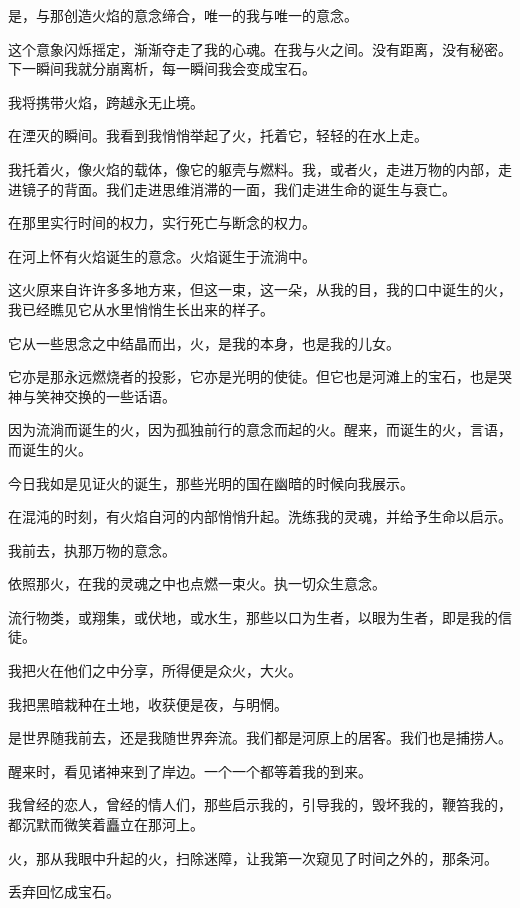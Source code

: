 \documentclass[UTF8]{article}
\begin{document}
\par 是，与那创造火焰的意念缔合，唯一的我与唯一的意念。
\par 这个意象闪烁摇定，渐渐夺走了我的心魂。在我与火之间。没有距离，没有秘密。下一瞬间我就分崩离析，每一瞬间我会变成宝石。
\par 我将携带火焰，跨越永无止境。
\par 在湮灭的瞬间。我看到我悄悄举起了火，托着它，轻轻的在水上走。
\par 我托着火，像火焰的载体，像它的躯壳与燃料。我，或者火，走进万物的内部，走进镜子的背面。我们走进思维消滞的一面，我们走进生命的诞生与衰亡。
\par 在那里实行时间的权力，实行死亡与断念的权力。
\par 在河上怀有火焰诞生的意念。火焰诞生于流淌中。
\par 这火原来自许许多多地方来，但这一束，这一朵，从我的目，我的口中诞生的火，我已经瞧见它从水里悄悄生长出来的样子。
\par 它从一些思念之中结晶而出，火，是我的本身，也是我的儿女。
\par 它亦是那永远燃烧者的投影，它亦是光明的使徒。但它也是河滩上的宝石，也是哭神与笑神交换的一些话语。
\par 因为流淌而诞生的火，因为孤独前行的意念而起的火。醒来，而诞生的火，言语，而诞生的火。
\par 今日我如是见证火的诞生，那些光明的国在幽暗的时候向我展示。
\par 在混沌的时刻，有火焰自河的内部悄悄升起。洗练我的灵魂，并给予生命以启示。
\\[0.6cm]
\par 我前去，执那万物的意念。
\par 依照那火，在我的灵魂之中也点燃一束火。执一切众生意念。
\par 流行物类，或翔集，或伏地，或水生，那些以口为生者，以眼为生者，即是我的信徒。
\par 我把火在他们之中分享，所得便是众火，大火。
\par 我把黑暗栽种在土地，收获便是夜，与明惘。
\par 是世界随我前去，还是我随世界奔流。我们都是河原上的居客。我们也是捕捞人。
\par 醒来时，看见诸神来到了岸边。一个一个都等着我的到来。
\par 我曾经的恋人，曾经的情人们，那些启示我的，引导我的，毁坏我的，鞭笞我的，都沉默而微笑着矗立在那河上。
\par 火，那从我眼中升起的火，扫除迷障，让我第一次窥见了时间之外的，那条河。
\par 丢弃回忆成宝石。
\end{document}
